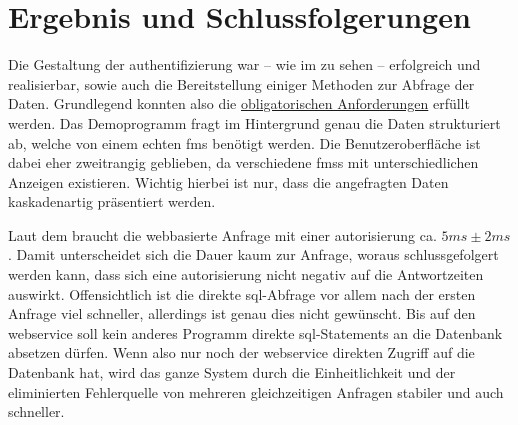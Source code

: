 \chapter{Ergebnis und Schlussfolgerungen}\label{ch:ergebnis-und-schlussfolgerungen}

	Die Gestaltung der \gls{authentifizierung} war
	-- wie im  zu sehen --
	erfolgreich und realisierbar,
	sowie auch die Bereitstellung einiger Methoden zur Abfrage der Daten.
	Grundlegend konnten also die \hyperref[sec:obligatorische-anforderungen]{obligatorischen Anforderungen} erfüllt werden.
	Das Demoprogramm fragt im Hintergrund genau die Daten strukturiert ab,
	welche von einem echten \gls{fms} benötigt werden.
	Die Benutzeroberfläche ist dabei eher zweitrangig geblieben,
	da verschiedene \glspl{fms} mit unterschiedlichen Anzeigen existieren.
	Wichtig hierbei ist nur,
	dass die angefragten Daten kaskadenartig präsentiert werden.

	Laut dem  braucht die webbasierte Anfrage
	mit einer \gls{autorisierung} ca. $5ms\pm2ms$.
	Damit unterscheidet sich die Dauer kaum zur  Anfrage,
	woraus schlussgefolgert werden kann,
	dass sich eine \gls{autorisierung} nicht negativ auf die Antwortzeiten auswirkt.
	Offensichtlich ist die direkte \gls{sql}-Abfrage vor allem nach der ersten Anfrage viel schneller,
	allerdings ist genau dies nicht gewünscht.
	Bis auf den \gls{webservice} soll kein anderes Programm
	direkte \gls{sql}-Statements an die Datenbank absetzen dürfen.
	Wenn also nur noch der \gls{webservice} direkten Zugriff auf die Datenbank hat,
	wird das ganze System durch die Einheitlichkeit
	und der eliminierten Fehlerquelle von mehreren gleichzeitigen Anfragen stabiler
	und auch schneller.